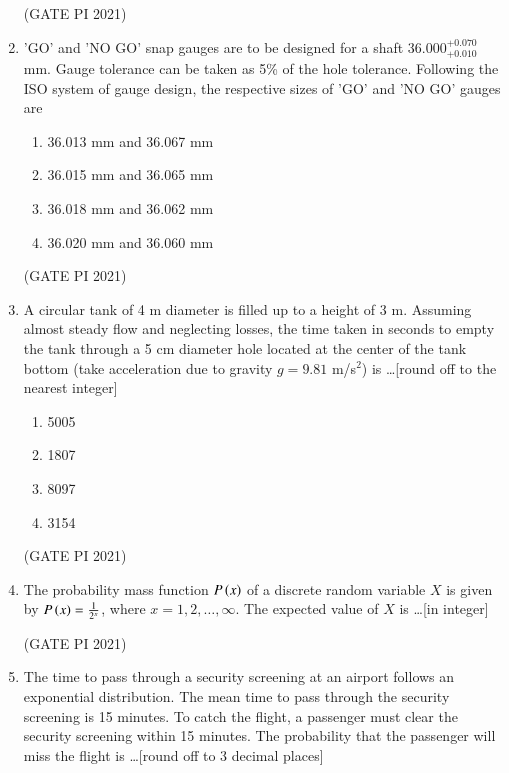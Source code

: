 \documentclass[journal,12pt,onecolumn]{IEEEtran}
\theoremstyle{remark}
\begin{document}
\begin{enumerate}
\hfill (GATE PI 2021)

\item
'GO' and 'NO GO' snap gauges are to be designed for a shaft 36.000$^{+0.070}_{+0.010}$ mm. Gauge tolerance can be taken as 5\% of the hole tolerance. Following the ISO system of gauge design, the respective sizes of 'GO' and 'NO GO' gauges are

\begin{multicols}{2}
\begin{enumerate}
\item 36.013 mm and 36.067 mm
\item 36.015 mm and 36.065 mm
\item 36.018 mm and 36.062 mm
\item 36.020 mm and 36.060 mm
\end{enumerate}
\end{multicols}

\hfill (GATE PI 2021)

\item
A circular tank of 4 m diameter is filled up to a height of 3 m. Assuming almost steady flow and neglecting losses, the time taken in seconds to empty the tank through a 5 cm diameter hole located at the center of the tank bottom (take acceleration due to gravity $g = 9.81$ m/s$^2$) is \ldots [round off to the nearest integer]

\begin{multicols}{4}
\begin{enumerate}
\item 5005
\item 1807
\item 8097
\item 3154
\end{enumerate}
\end{multicols}

\hfill (GATE PI 2021)

\item
The probability mass function $P\left(x\right)$ of a discrete random variable $X$ is given by $P\left(x\right) = \frac{1}{2^x}$, where $x = 1, 2, \ldots, \infty$. The expected value of $X$ is \ldots [in integer]

\hfill (GATE PI 2021)

\item
The time to pass through a security screening at an airport follows an exponential distribution. The mean time to pass through the security screening is 15 minutes. To catch the flight, a passenger must clear the security screening within 15 minutes. The probability that the passenger will miss the flight is \ldots [round off to 3 decimal places]


\end{enumerate}
\end{document}
